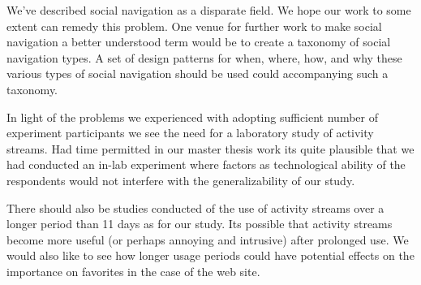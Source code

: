 We've described social navigation as a disparate field. We hope our work to
some extent can remedy this problem. One venue for further work to make social
navigation a better understood term would be to create a taxonomy of social
navigation types. A set of design patterns for when, where, how, and why these
various types of social navigation should be used could accompanying such a
taxonomy.

\parabreak

In light of the problems we experienced with adopting sufficient number of
experiment participants we see the need for a laboratory study of activity
streams. Had time permitted in our master thesis work its quite plausible that
we had conducted an in-lab experiment where factors as technological ability
of the respondents would not interfere with the generalizability of our study.

There should also be studies conducted of the use of activity streams over a
longer period than 11 days as for our study. Its possible that activity
streams become more useful (or perhaps annoying and intrusive) after prolonged
use. We would also like to see how longer usage periods could have potential
effects on the importance on favorites in the case of the \urort{} web site.
